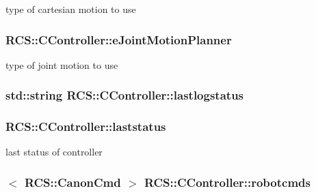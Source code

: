 type of cartesian motion to use \hypertarget{structRCS_1_1CController_ad788d0def2101be74b680394bcbc78e7}{
\subsubsection[{e\-Joint\-Motion\-Planner}]{ R\-C\-S\-::\-C\-Controller\-::e\-Joint\-Motion\-Planner}}\label{structRCS_1_1CController_ad788d0def2101be74b680394bcbc78e7}
type of joint motion to use \hypertarget{structRCS_1_1CController_a8bd2705747d1e16f5806ddf183bfade7}{
\subsubsection[{lastlogstatus}]{\setlength{\rightskip}{0pt plus 5cm}std\-::string R\-C\-S\-::\-C\-Controller\-::lastlogstatus}}\label{structRCS_1_1CController_a8bd2705747d1e16f5806ddf183bfade7}
\hypertarget{structRCS_1_1CController_af76ac9412dbefbaebc970d62f88a40fa}{
\subsubsection[{laststatus}]{ R\-C\-S\-::\-C\-Controller\-::laststatus\hspace{0.3cm}{\ttfamily [static]}}}\label{structRCS_1_1CController_af76ac9412dbefbaebc970d62f88a40fa}
last status of controller \hypertarget{structRCS_1_1CController_aa96c7961737b7e1cf5d8b4180f4bc399}{
\subsubsection[{robotcmds}]{$<$ {\bf R\-C\-S\-::\-Canon\-Cmd} $>$ R\-C\-S\-::\-C\-Controller\-::robotcmds\hspace{0.3cm}{\ttfamily [static]}}}\label{structRCS_1_1CController_aa96c7961737b7e1cf5d8b4180f4bc399}
